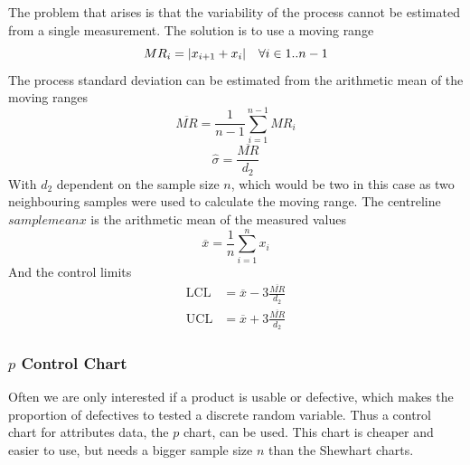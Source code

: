 \documentclass[11pt]{article}
\theoremstyle{definition}
\newcommand*\samplemean[1]{\overline{#1}}
\DeclarePairedDelimiter\abs{\lvert}{\rvert}
\begin{document}
The problem that arises is that the variability of the process cannot be estimated from a single measurement. The solution is to use a moving range
\begin{equation*}
	MR_i = \abs{x_{i+1} + x_i}\quad \forall i\in1..n-1
\end{equation*}
The process standard deviation can be estimated from the arithmetic mean of the moving ranges
\begin{equation*}
	\samplemean{MR} = \frac{1}{n-1}\sum_{i=1}^{n-1}MR_i
\end{equation*}
\begin{equation*}
	\hat{\sigma} = \frac{\samplemean{MR}}{d_2}
\end{equation*}
With $d_2$ dependent on the sample size $n$, which would be two in this case as two neighbouring samples were used to calculate the moving range.
The centreline $samplemean{x}$ is the arithmetic mean of the measured values
\begin{equation*}
	\samplemean{x} = \frac{1}{n}\sum_{i=1}^{n}x_i
\end{equation*}
And the control limits
\begin{align*}
	\text{LCL} &= \samplemean{x} - 3\frac{\samplemean{MR}}{d_2}\\
	\text{UCL} &= \samplemean{x} + 3\frac{\samplemean{MR}}{d_2}
\end{align*}

\subsubsection{$p$ Control Chart}
Often we are only interested if a product is usable or defective, which makes the proportion of defectives to tested a discrete random variable. Thus a control chart for attributes data, the $p$ chart, can be used. This chart is cheaper and easier to use, but needs a bigger sample size $n$ than the Shewhart charts.
\end{document}
